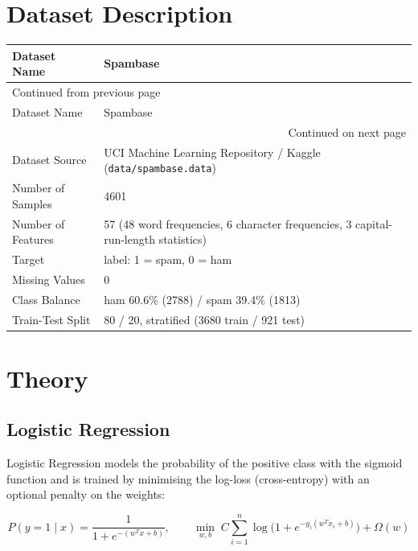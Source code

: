 \documentclass[11pt]{article}
\begin{document}
\section*{Dataset Description}
\label{sec:org8886bf4}


\begin{longtable}{|p{4cm}|p{11cm}|}
\hline
Dataset Name & Spambase\\[0pt]
\hline
\endfirsthead
\multicolumn{2}{l}{Continued from previous page} \\[0pt]
\hline

Dataset Name & Spambase \\[0pt]

\hline
\endhead
\hline\multicolumn{2}{r}{Continued on next page} \\
\endfoot
\endlastfoot
\hline
Dataset Source & UCI Machine Learning Repository / Kaggle (\texttt{data/spambase.data})\\[0pt]
\hline
Number of Samples & 4601\\[0pt]
\hline
Number of Features & 57 (48 word frequencies, 6 character frequencies, 3 capital-run-length statistics)\\[0pt]
\hline
Target & label: 1 = spam, 0 = ham\\[0pt]
\hline
Missing Values & 0\\[0pt]
\hline
Class Balance & ham 60.6\% (2788) / spam 39.4\% (1813)\\[0pt]
\hline
Train-Test Split & 80 / 20, stratified (3680 train / 921 test)\\[0pt]
\hline
\end{longtable}

\section*{Theory}
\label{sec:org586b092}


\subsection*{Logistic Regression}
\label{sec:org2a1471b}


Logistic Regression models the probability of the positive class with the sigmoid function
and is trained by minimising the log-loss (cross-entropy) with an optional penalty on the
weights:

\[ P(y=1 \mid x) = \frac{1}{1 + e^{-(w^{T}x + b)}}, \qquad
\min_{w,b}\; C\sum_{i=1}^{n} \log\bigl(1 + e^{-y_i (w^{T}x_i + b)}\bigr) + \Omega(w) \]
\end{document}
